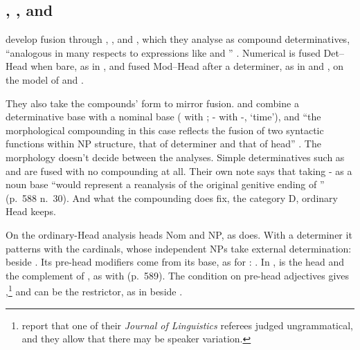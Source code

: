 \documentclass[12pt]{article}
\begin{document}
\subsection{, , and }\label{sec:once}

\textcite{Payne2007} develop fusion through , , and , which they analyse as compound determinatives, \enquote{analogous in many respects to expressions like  and } \citep[565]{Payne2007}. Numerical  is fused Det--Head when bare, as in , and fused Mod--Head after a determiner, as in  and , on the model of  and  \citep[586, 588]{Payne2007}.

They also take the compounds' form to mirror fusion.  and  combine a determinative base with a nominal base ( with ; - with -, \enquote*{time}), and \enquote{the morphological compounding in this case reflects the fusion of two syntactic functions within NP structure, that of determiner and that of head} \citep[565, 587--588]{Payne2007}. The morphology doesn't decide between the analyses. Simple determinatives such as  and  are fused with no compounding at all. Their own note says that taking - as a noun base \enquote{would represent a reanalysis of the original genitive ending of } (p.~588 n.~30). And what the compounding does fix, the category D, ordinary Head keeps.

On the ordinary-Head analysis  heads Nom and NP, as  does. With a determiner it patterns with the cardinals, whose independent NPs take external determination:  \citep[586]{Payne2007} beside . Its pre-head modifiers come from its base, as for :  \citep[589]{Payne2007}. In ,  is the head and  the complement of , as with  (p.~589). The condition on pre-head adjectives gives ,\footnote{\textcite[586 n.~26]{Payne2007} report that one of their \textit{Journal of Linguistics} referees judged  ungrammatical, and they allow that there may be speaker variation.} and  can be the restrictor, as in  beside  \citep[591]{Payne2007}.
\end{document}
